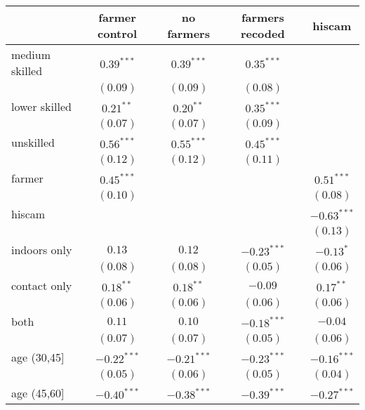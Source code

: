 
\begin{table}
\begin{center}
\begin{tabular}{l c c c c}
\hline
 & farmer control & no farmers & farmers recoded & hiscam \\
\hline
medium skilled & $0.39^{***}$  & $0.39^{***}$  & $0.35^{***}$  &               \\
               & $(0.09)$      & $(0.09)$      & $(0.08)$      &               \\
lower skilled  & $0.21^{**}$   & $0.20^{**}$   & $0.35^{***}$  &               \\
               & $(0.07)$      & $(0.07)$      & $(0.09)$      &               \\
unskilled      & $0.56^{***}$  & $0.55^{***}$  & $0.45^{***}$  &               \\
               & $(0.12)$      & $(0.12)$      & $(0.11)$      &               \\
farmer         & $0.45^{***}$  &               &               & $0.51^{***}$  \\
               & $(0.10)$      &               &               & $(0.08)$      \\
hiscam         &               &               &               & $-0.63^{***}$ \\
               &               &               &               & $(0.13)$      \\
indoors only   & $0.13$        & $0.12$        & $-0.23^{***}$ & $-0.13^{*}$   \\
               & $(0.08)$      & $(0.08)$      & $(0.05)$      & $(0.06)$      \\
contact only   & $0.18^{**}$   & $0.18^{**}$   & $-0.09$       & $0.17^{**}$   \\
               & $(0.06)$      & $(0.06)$      & $(0.06)$      & $(0.06)$      \\
both           & $0.11$        & $0.10$        & $-0.18^{***}$ & $-0.04$       \\
               & $(0.07)$      & $(0.07)$      & $(0.05)$      & $(0.06)$      \\
age (30,45]    & $-0.22^{***}$ & $-0.21^{***}$ & $-0.23^{***}$ & $-0.16^{***}$ \\
               & $(0.05)$      & $(0.06)$      & $(0.05)$      & $(0.04)$      \\
age (45,60]    & $-0.40^{***}$ & $-0.38^{***}$ & $-0.39^{***}$ & $-0.27^{***}$ \\

\end{tabular}
\end{center}
\end{table}

